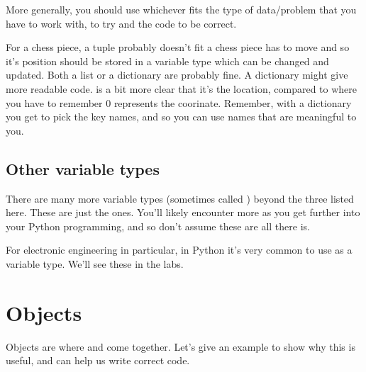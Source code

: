 \documentclass[letterpaper,10pt,british]{sphinxmanual}
\begin{document}
\sphinxAtStartPar
More generally, you should use whichever fits the type of data/problem that you have to work with, to try and  the code to be correct.

\sphinxAtStartPar
For a chess piece, a tuple probably doesn’t fit \sphinxhyphen{} a chess piece has to move and so it’s position should be stored in a variable type which can be changed and updated. Both a list or a dictionary are probably fine. A dictionary might give more readable code.  is a bit more clear that it’s the  location, compared to  where you have to remember 0 represents the  coorinate. Remember, with a dictionary you get to pick the key names, and so you can use names that are meaningful to you.


\subsection{Other variable types}
\label{\detokenize{chapters/programming_fundamentals/variables:other-variable-types}}
\sphinxAtStartPar
There are many more variable types (sometimes called ) beyond the three listed here. These are just the  ones. You’ll likely encounter more as you get further into your Python programming, and so don’t assume these are all there is.

\sphinxAtStartPar
For electronic engineering in particular, in Python it’s very common to use  as a variable type. We’ll see these in the labs.

\sphinxstepscope


\section{Objects}
\label{\detokenize{chapters/programming_fundamentals/objects:objects}}\label{\detokenize{chapters/programming_fundamentals/objects:id1}}\label{\detokenize{chapters/programming_fundamentals/objects::doc}}
\sphinxAtStartPar
Objects are where {\hyperref[\detokenize{chapters/programming_fundamentals/functions:functions}]{}} and {\hyperref[\detokenize{chapters/programming_fundamentals/variables:variables}]{}} come together. Let’s give an example to show why this is useful, and can help us write correct code.
\end{document}
